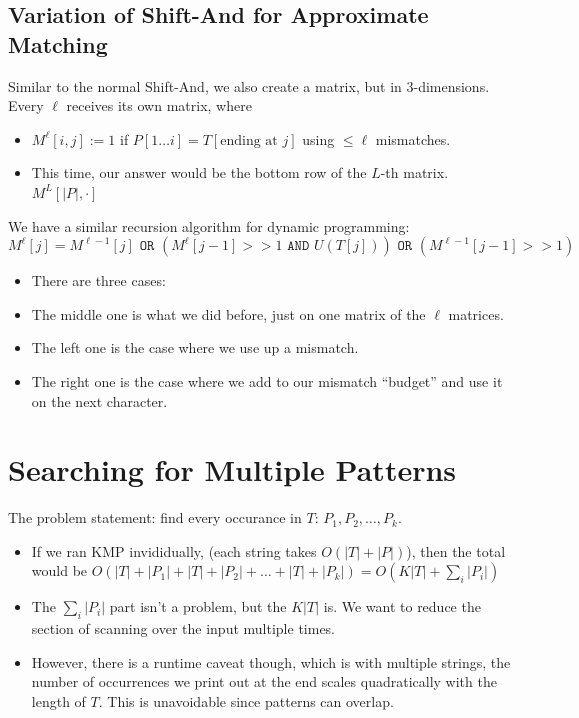\documentclass[10pt]{article}
\begin{document}
\subsection*{Variation of Shift-And for Approximate Matching}
Similar to the normal Shift-And, we also create a matrix, but in 3-dimensions.  Every $\ell$ receives its own matrix, where
\begin{itemize}
	\item $M^\ell[i, j] := 1$ if $P[1 \dots i] = T[\text{ending at }j]$ using $\leq \ell$ mismatches.
	\item This time, our answer would be the bottom row of the $L$-th matrix.  $M^L[|P|, \cdot]$
\end{itemize}
We have a similar recursion algorithm for dynamic programming:
\[M^\ell[j] = M^{\ell - 1}[j] \texttt{ OR } \left(M^\ell[j - 1] >> 1 \texttt{ AND } U(T[j])\right) \texttt{ OR } \left(M^{\ell - 1}[j - 1] >> 1\right)\]
\begin{itemize}
	\item There are three cases:
	\item The middle one is what we did before, just on one matrix of the $\ell$ matrices.
	\item The left one is the case where we use up a mismatch.
	\item The right one is the case where we add to our mismatch ``budget'' and use it on the next character.
\end{itemize}

\section*{Searching for Multiple Patterns}
The problem statement: find every occurance in $T$: $P_1, P_2, \dots, P_k$.
\begin{itemize}
	\item If we ran KMP invididually, (each string takes $O(|T| + |P|)$), then the total would be $O(|T| + |P_1| + |T| + |P_2| + \dots + |T| + |P_k|) = O(K|T| + \sum_i |P_i|)$
	\item The $\sum_i |P_i|$ part isn't a problem, but the $K|T|$ is.  We want to reduce the section of scanning over the input multiple times.
	\item However, there is a runtime caveat though, which is with multiple strings, the number of occurrences we print out at the end scales quadratically with the length of $T$.  This is unavoidable since patterns can overlap.
\end{itemize}
\end{document}
